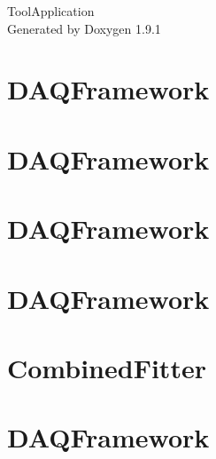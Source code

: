 \let\mypdfximage\pdfximage\def\pdfximage{\immediate\mypdfximage}\documentclass[twoside]{book}
\newcommand{\+}{\discretionary{\mbox{\scriptsize$\hookleftarrow$}}{}{}}
\newcommand{\clearemptydoublepage}{%
  \newpage{\pagestyle{empty}\cleardoublepage}%
}
\begin{document}
\raggedbottom

\hypersetup{pageanchor=false,
             bookmarksnumbered=true,
             pdfencoding=unicode
            }
\begin{titlepage}
\vspace*{7cm}
\begin{center}%
{\Large Tool\+Application }\\
\vspace*{1cm}
{\large Generated by Doxygen 1.9.1}\\
\end{center}
\end{titlepage}
\clearemptydoublepage
{}
\tableofcontents
\clearemptydoublepage
{}
\hypersetup{pageanchor=true}

\chapter{DAQFramework}
\label{md_UserTools_AddTree_README}

\chapter{DAQFramework}
\label{md_UserTools_BuildHist_README}

\chapter{DAQFramework}
\label{md_UserTools_CalculateNeutronCloudVertex_README}

\chapter{DAQFramework}
\label{md_UserTools_CalculatePreactivityObservables_README}

\chapter{Combined\+Fitter}
\label{md_UserTools_CombinedFitter_README}

\chapter{DAQFramework}
\label{md_UserTools_CompareRootFiles_README}

\end{document}
